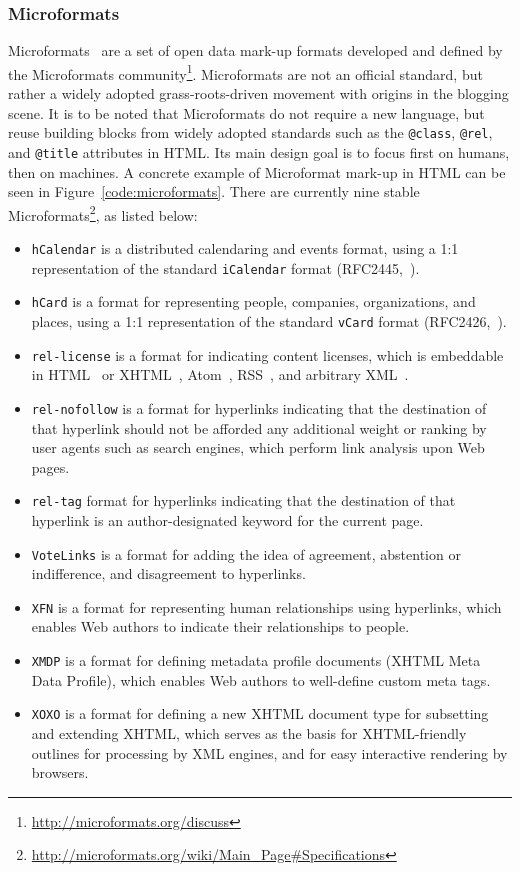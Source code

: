 \documentclass[12pt]{article}
\begin{document}
\subsubsection{Microformats}
Microformats~\cite{microformats} are a set of open data mark-up formats developed and defined by the Microformats community\footnote{\url{http://microformats.org/discuss}}. Microformats are not an official standard, but rather a widely adopted grass-roots-driven movement with origins in the blogging scene. It is to be noted that Microformats do not require a new language, but reuse building blocks from widely adopted standards such as the \texttt{@class}, \texttt{@rel}, and \texttt{@title} attributes in HTML. Its main design goal is to focus first on humans, then on machines. A concrete example of Microformat mark-up in HTML can be seen in Figure~\ref{code:microformats}. There are currently nine stable Microformats\footnote{\url{http://microformats.org/wiki/Main_Page\#Specifications}}, as listed below:
\begin{itemize}
\item \texttt{hCalendar} is a distributed calendaring and events format, using a 1:1 representation of the standard \texttt{iCalendar} format (RFC2445,~\cite{Dawson:1998:ICS:RFC2445}).
\item \texttt{hCard} is a format for representing people, companies, organizations, and places, using a 1:1 representation of the standard \texttt{vCard} format (RFC2426,~\cite{Dawson:1998:VMD:RFC2426}).
\item \texttt{rel-license} is a format for indicating content licenses, which is embeddable in HTML~\cite{w3c_html4} or XHTML~\cite{xhtml10sec}, Atom~\cite{Atom:Synd}, RSS~\cite{rss2006rss}, and arbitrary XML~\cite{Bray1998}.
\item \texttt{rel-nofollow} is a format for hyperlinks indicating that the destination of that hyperlink should not be afforded any additional weight or ranking by user agents such as search engines, which perform link analysis upon Web pages.
\item \texttt{rel-tag} format for hyperlinks indicating that the destination of that hyperlink is an author-designated keyword for the current page.
\item \texttt{VoteLinks} is a format for adding the idea of agreement, abstention or indifference, and disagreement to hyperlinks.
\item \texttt{XFN} is a format for representing human relationships using hyperlinks, which enables Web authors to indicate their relationships to people.
\item \texttt{XMDP} is a format for defining metadata profile documents (XHTML Meta Data Profile), which enables Web authors to well-define custom meta tags.
\item \texttt{XOXO} is a format for defining a new XHTML document type for subsetting and extending XHTML, which serves as the basis for XHTML-friendly outlines for processing by XML engines, and for easy interactive rendering by browsers.
\end{itemize}
\end{document}
